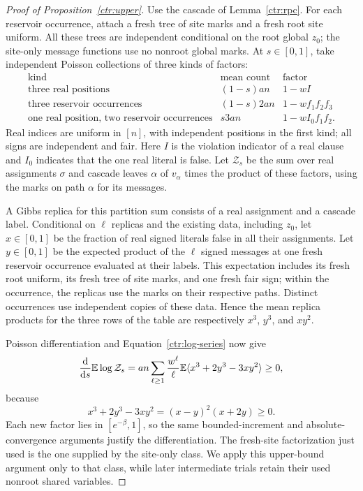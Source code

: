 \begin{proof}[Proof of Proposition~\ref{ctr:upper}]
Use the cascade of Lemma~\ref{ctr:rpc}.  For each reservoir occurrence,
attach a fresh tree of site marks and a fresh root site uniform.  All these
trees are independent conditional on the root global $z_0$; the site-only
message functions use no nonroot global marks.  At $s\in[0,1]$, take
independent Poisson collections of three kinds of factors:
\[
 \begin{array}{c|c|c}
 \text{kind}&\text{mean count}&\text{factor}\\ \hline
 \text{three real positions}&(1-s)an&1-wI\\
 \text{three reservoir occurrences}&(1-s)2an&1-wf_1f_2f_3\\
 \text{one real position, two reservoir occurrences}&s3an&1-wI_0f_1f_2.
 \end{array}
\]
Real indices are uniform in $[n]$, with independent positions in the first
kind; all signs are independent and fair.  Here $I$ is the violation
indicator of a real clause and $I_0$ indicates that the one real literal
is false.  Let $\mathcal Z_s$ be the sum over real assignments $\sigma$ and
cascade leaves $\alpha$ of $v_\alpha$ times the product of these factors,
using the marks on path $\alpha$ for its messages.

A Gibbs replica for this partition sum consists of a real assignment and
a cascade label.  Conditional on $\ell$ replicas and the existing data,
including $z_0$,
let $x\in[0,1]$ be the fraction of real signed literals false in all their
assignments.  Let $y\in[0,1]$ be the expected product of the $\ell$ signed
messages at one fresh reservoir occurrence evaluated at their labels.
This expectation includes its fresh root uniform, its fresh tree of site
marks, and one fresh fair sign; within the occurrence, the replicas use
the marks on their respective paths.  Distinct occurrences use independent
copies of these data.  Hence the mean replica products for the three rows
of the table are respectively $x^3$, $y^3$, and $xy^2$.

Poisson differentiation and Equation~\eqref{ctr:log-series} now give
\[
 \frac{\mathrm d}{\mathrm ds}\mathbb E\log\mathcal Z_s
 =an\sum_{\ell\ge1}\frac{w^\ell}{\ell}
    \mathbb E\langle x^3+2y^3-3xy^2\rangle\ge0,
\]
because
\begin{equation}
 x^3+2y^3-3xy^2=(x-y)^2(x+2y)\ge0.
 \label{ctr:cubic}
\end{equation}
Each new factor lies in $[e^{-\beta},1]$, so the same bounded-increment and
absolute-convergence arguments justify the differentiation.  The fresh-site
factorization just used is the one supplied by the site-only class.  We
apply this upper-bound argument only to that class, while later intermediate
trials retain their used nonroot shared variables.


\end{proof}
